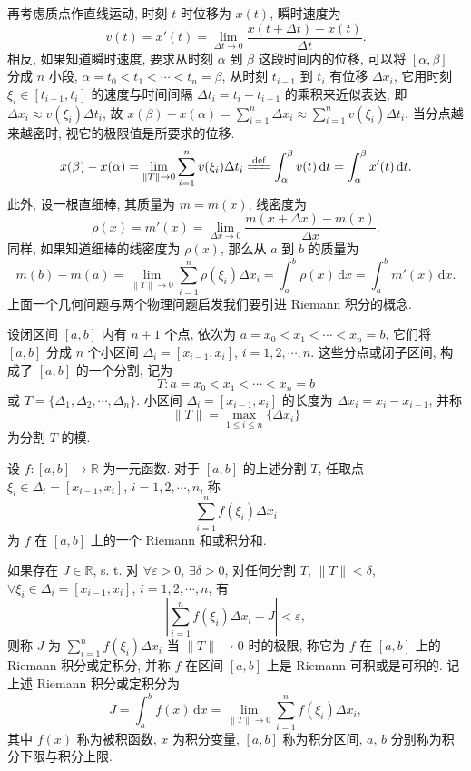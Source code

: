 再考虑质点作直线运动, 时刻 $t$ 时位移为 $x(t)$, 瞬时速度为
\[
v(t)=x'(t)=\lim_{\Delta t\to 0}\frac{x(t+\Delta t)-x(t)}{\Delta t}.
\]
相反, 如果知道瞬时速度, 要求从时刻 $\alpha$ 到 $\beta$ 这段时间内的位移, 可以将 $[\alpha,\beta]$ 分成 $n$ 小段, $\alpha=t_{0}<t_{1}<\cdots<t_{n}=\beta$, 从时刻 $t_{i-1}$ 到 $t_{i}$ 有位移 $\Delta x_{i}$, 它用时刻 $\xi_{i}\in[t_{i-1},t_{i}]$ 的速度与时间间隔 $\Delta t_{i}=t_{i}-t_{i-1}$ 的乘积来近似表达, 即 $\Delta x_{i}\approx v(\xi_{i})\Delta t_{i}$, 故 $x(\beta)-x(\alpha)=\sum\limits_{i=1}^{n}\Delta x_{i}\approx\sum\limits_{i=1}^{n}v(\xi_{i})\Delta t_{i}$. 当分点越来越密时, 视它的极限值是所要求的位移.
\[
x(\beta)-x(\alpha)=\lim_{\|T\|\to 0}\sum_{i=1}^{n}v(\xi_{i})\Delta t_{i}\xlongequal{\text{def}}\int_{\alpha}^{\beta}v(t)\,\mathrm{d}t=\int_{\alpha}^{\beta}x'(t)\,\mathrm{d}t.
\]
此外, 设一根直细棒, 其质量为 $m=m(x)$, 线密度为
\[
\rho(x)=m'(x)=\lim_{\Delta x\to 0}\frac{m(x+\Delta x)-m(x)}{\Delta x}.
\]
同样, 如果知道细棒的线密度为 $\rho(x)$, 那么从 $a$ 到 $b$ 的质量为
\[
m(b)-m(a)=\lim_{\|T\|\to 0}\sum_{i=1}^{n}\rho(\xi_{i})\Delta x_{i}=\int_{a}^{b}\rho(x)\,\mathrm{d}x=\int_{a}^{b}m'(x)\,\mathrm{d}x.
\]
上面一个几何问题与两个物理问题启发我们要引进 Riemann 积分的概念.

\begin{definition}\label{def:6.1.1}
设闭区间 $[a,b]$ 内有 $n+1$ 个点, 依次为 $a=x_{0}<x_{1}<\cdots<x_{n}=b$, 它们将 $[a,b]$ 分成 $n$ 个小区间 $\Delta_{i}=[x_{i-1},x_{i}]$, $i=1,2,\cdots,n$. 这些分点或闭子区间, 构成了 $[a,b]$ 的一个分割, 记为
\[
T: a=x_{0}<x_{1}<\cdots<x_{n}=b
\]
或 $T=\{\Delta_{1},\Delta_{2},\cdots,\Delta_{n}\}$. 小区间 $\Delta_{i}=[x_{i-1},x_{i}]$ 的长度为 $\Delta x_{i}=x_{i}-x_{i-1}$, 并称
\[
\|T\|=\max_{1\leqslant i\leqslant n}\{\Delta x_{i}\}
\]
为分割 $T$ 的模.

设 $f:[a,b]\to\mathbb{R}$ 为一元函数. 对于 $[a,b]$ 的上述分割 $T$, 任取点 $\xi_{i}\in\Delta_{i}=[x_{i-1},x_{i}]$, $i=1,2,\cdots,n$, 称
\[
\sum_{i=1}^{n}f(\xi_{i})\Delta x_{i}
\]
为 $f$ 在 $[a,b]$ 上的一个 Riemann 和或积分和.

如果存在 $J\in\mathbb{R}$, s. t. 对 $\forall\varepsilon>0$, $\exists\delta>0$, 对任何分割 $T$, $\|T\|<\delta$, $\forall\xi_{i}\in\Delta_{i}=[x_{i-1},x_{i}]$, $i=1,2,\cdots,n$, 有
\[
\left|\sum_{i=1}^{n}f(\xi_{i})\Delta x_{i}-J\right|<\varepsilon,
\]
则称 $J$ 为 $\sum\limits_{i=1}^{n}f(\xi_{i})\Delta x_{i}$ 当 $\|T\|\to 0$ 时的极限, 称它为 $f$ 在 $[a,b]$ 上的 Riemann 积分或定积分, 并称 $f$ 在区间 $[a,b]$ 上是 Riemann 可积或是可积的. 记上述 Riemann 积分或定积分为
\[
J=\int_{a}^{b}f(x)\,\mathrm{d}x=\lim_{\|T\|\to 0}\sum_{i=1}^{n}f(\xi_{i})\Delta x_{i},
\]
其中 $f(x)$ 称为被积函数, $x$ 为积分变量, $[a,b]$ 称为积分区间, $a$, $b$ 分别称为积分下限与积分上限.
\end{definition}

